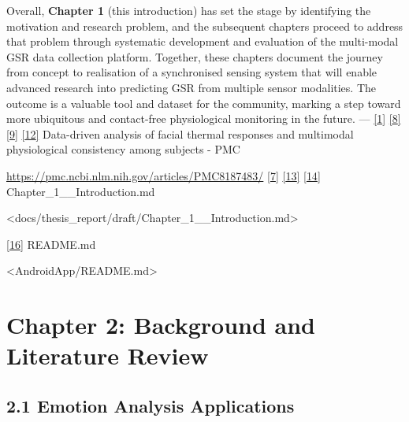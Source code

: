 \documentclass[12pt,a4paper]{article}
\begin{document}
Overall, \textbf{Chapter 1} (this introduction) has set the stage by identifying the motivation and research problem, and the subsequent chapters proceed to address that problem through systematic development and evaluation of the multi-modal GSR data collection platform. Together, these chapters document the journey from concept to realisation of a synchronised sensing system that will enable advanced research into predicting GSR from multiple sensor modalities. The outcome is a valuable tool and dataset for the community, marking a step toward more ubiquitous and contact-free physiological monitoring in the future. --- \href{https://pmc.ncbi.nlm.nih.gov/articles/PMC8187483/\#:~:text=Galvanic\%20skin\%20response\%20,conditions\%20which\%20recent\%20studies\%20have}{{[}1{]}} \href{https://pmc.ncbi.nlm.nih.gov/articles/PMC8187483/\#:~:text=measures\%20targeting\%20a\%20variety\%20of,in\%20affective\%20research7\%20\%E2\%80\%93\%2032}{{[}8{]}} \href{https://pmc.ncbi.nlm.nih.gov/articles/PMC8187483/\#:~:text=compliments\%20the\%20traditional\%20measures\%20is,results\%20in\%20affective\%20research\%2031\%E2\%80\%939}{{[}9{]}} \href{https://pmc.ncbi.nlm.nih.gov/articles/PMC8187483/\#:~:text=compliments\%20the\%20traditional\%20measures\%20is,results\%20in\%20affective\%20research\%2031\%E2\%80\%939}{{[}12{]}} Data-driven analysis of facial thermal responses and multimodal physiological consistency among subjects - PMC

\url{https://pmc.ncbi.nlm.nih.gov/articles/PMC8187483/} \href{docs/thesis_report/draft/Chapter_1__Introduction.md\#L24-L31}{{[}7{]}} \href{docs/thesis_report/draft/Chapter_1__Introduction.md\#L24-L32}{{[}13{]}} \href{docs/thesis_report/draft/Chapter_1__Introduction.md\#L30-L34}{{[}14{]}} Chapter\_1\_\_Introduction.md

\textless docs/thesis\_report/draft/Chapter\_1\_\_Introduction.md\textgreater{}

\href{AndroidApp/README.md\#L2-L5}{{[}16{]}} README.md

\textless AndroidApp/README.md\textgreater{}

\newpage

\section{Chapter 2: Background and Literature Review}\label{chapter-2-background-and-literature-review}

\subsection{2.1 Emotion Analysis Applications}\label{emotion-analysis-applications}
\end{document}
